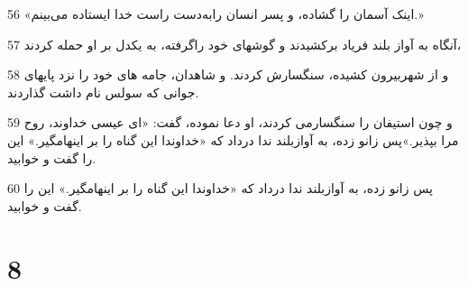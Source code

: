 \par 56 «اینک آسمان را گشاده، و پسر انسان رابه‌دست راست خدا ایستاده می‌بینم.»
\par 57 آنگاه به آواز بلند فریاد برکشیدند و گوشهای خود راگرفته، به یکدل بر او حمله کردند،
\par 58 و از شهربیرون کشیده، سنگسارش کردند. و شاهدان، جامه های خود را نزد پایهای جوانی که سولس نام داشت گذاردند.
\par 59 و چون استیفان را سنگسارمی کردند، او دعا نموده، گفت: «ای عیسی خداوند، روح مرا بپذیر.»پس زانو زده، به آوازبلند ندا در‌داد که «خداوندا این گناه را بر اینهامگیر.» این را گفت و خوابید.
\par 60 پس زانو زده، به آوازبلند ندا در‌داد که «خداوندا این گناه را بر اینهامگیر.» این را گفت و خوابید.

\chapter{8}


